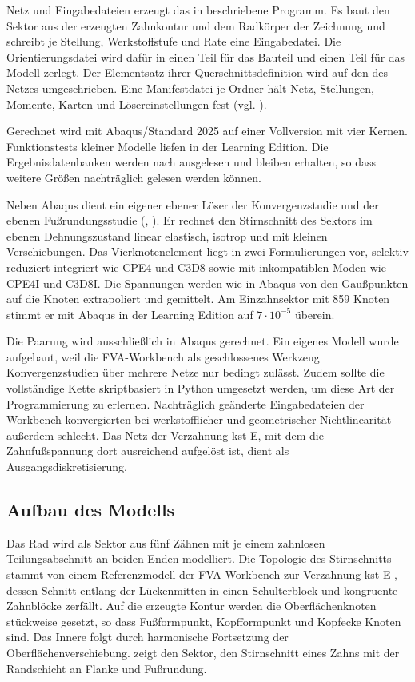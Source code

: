 Netz und Eingabedateien erzeugt das in  beschriebene Programm. Es baut den Sektor aus der erzeugten Zahnkontur und dem Radkörper der Zeichnung und schreibt je Stellung, Werkstoffstufe und Rate eine Eingabedatei. Die Orientierungsdatei wird dafür in einen Teil für das Bauteil und einen Teil für das Modell zerlegt. Der Elementsatz ihrer Querschnittsdefinition wird auf den des Netzes umgeschrieben. Eine Manifestdatei je Ordner hält Netz, Stellungen, Momente, Karten und Lösereinstellungen fest (vgl. ).

Gerechnet wird mit Abaqus/Standard 2025 auf einer Vollversion mit vier Kernen. Funktionstests kleiner Modelle liefen in der Learning Edition. Die Ergebnisdatenbanken werden nach  ausgelesen und bleiben erhalten, so dass weitere Größen nachträglich gelesen werden können.

Neben Abaqus dient ein eigener ebener Löser der Konvergenzstudie und der ebenen Fußrundungsstudie (, ). Er rechnet den Stirnschnitt des Sektors im ebenen Dehnungszustand linear elastisch, isotrop und mit kleinen Verschiebungen. Das Vierknotenelement liegt in zwei Formulierungen vor, selektiv reduziert integriert wie CPE4 und C3D8 sowie mit inkompatiblen Moden wie CPE4I und C3D8I. Die Spannungen werden wie in Abaqus von den Gaußpunkten auf die Knoten extrapoliert und gemittelt. Am Einzahnsektor mit 859 Knoten stimmt er mit Abaqus in der Learning Edition auf $7 \cdot 10^{-5}$ überein.

Die Paarung wird ausschließlich in Abaqus gerechnet. Ein eigenes Modell wurde aufgebaut, weil die FVA-Workbench als geschlossenes Werkzeug Konvergenzstudien über mehrere Netze nur bedingt zulässt. Zudem sollte die vollständige Kette skriptbasiert in Python umgesetzt werden, um diese Art der Programmierung zu erlernen. Nachträglich geänderte Eingabedateien der Workbench konvergierten bei werkstofflicher und geometrischer Nichtlinearität außerdem schlecht. Das Netz der Verzahnung kst-E, mit dem die Zahnfußspannung dort ausreichend aufgelöst ist, dient als Ausgangsdiskretisierung.

\subsection{Aufbau des Modells}
\label{sec:fe_modellaufbau}

Das Rad wird als Sektor aus fünf Zähnen mit je einem zahnlosen Teilungsabschnitt an beiden Enden modelliert. Die Topologie des Stirnschnitts stammt von einem Referenzmodell der FVA Workbench zur Verzahnung kst-E \cite{FVA856-I}, dessen Schnitt entlang der Lückenmitten in einen Schulterblock und kongruente Zahnblöcke zerfällt. Auf die erzeugte Kontur werden die Oberflächenknoten stückweise gesetzt, so dass Fußformpunkt, Kopfformpunkt und Kopfecke Knoten sind. Das Innere folgt durch harmonische Fortsetzung der Oberflächenverschiebung.  zeigt den Sektor,  den Stirnschnitt eines Zahns mit der Randschicht an Flanke und Fußrundung.

